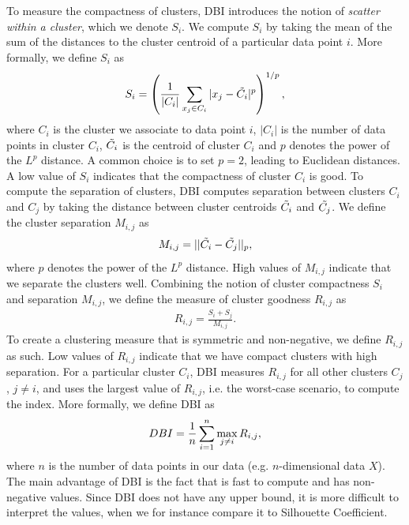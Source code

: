 To measure the compactness of clusters, DBI introduces the notion of \textit{scatter within a cluster}, which we denote $S_i$. We compute $S_i$ by taking the mean of the sum of the distances to the cluster centroid of a particular data point $i$. More formally, we define $S_i$ as
\begin{align}
    S_i = \left( \frac{1}{|C_i|} \sum\limits_{x_j \in C_i}^{} |x_j - \Tilde{C_i}|^p\right)^{1/p},
    \label{eqn:dbi-s}
\end{align}
where $C_i$ is the cluster we associate to data point $i$, $|C_i|$ is the number of data points in cluster $C_i$, $\Tilde{C_i}$ is the centroid of cluster $C_i$ and $p$ denotes the power of the $L^p$ distance. A common choice is to set $p=2$, leading to Euclidean distances. A low value of $S_i$ indicates that the compactness of cluster $C_i$ is good. To compute the separation of clusters, DBI computes separation between clusters $C_i$ and $C_j$ by taking the distance between cluster centroids $\Tilde{C_i}$ and $\Tilde{C_j}$. We define the cluster separation $M_{i, j}$ as
\begin{align}
    M_{i, j} = ||\Tilde{C_i} - \Tilde{C_j}||_p,
    \label{eqn:dbi-m}
\end{align}
where $p$ denotes the power of the $L^p$ distance. High values of $M_{i, j}$ indicate that we separate the clusters well. Combining the notion of cluster compactness $S_i$ and separation $M_{i, j}$, we define the measure of cluster goodness $R_{i, j}$ as
\begin{align}
    R_{i, j} = \frac{S_i + S_j}{M_{i, j}}.
    \label{eqn:dbi-r}
\end{align}
To create a clustering measure that is symmetric and non-negative, we define $R_{i, j}$ as such. Low values of $R_{i, j}$ indicate that we have compact clusters with high separation. For a particular cluster $C_i$, DBI measures $R_{i, j}$ for all other clusters $C_j$, $j \neq i$, and uses the largest value of $R_{i, j}$, i.e. the worst-case scenario, to compute the index. More formally, we define DBI as
\begin{align}
    DBI = \frac{1}{n} \sum\limits_{i=1}^{n} \max_{j \neq i} R_{i, j},
    \label{eqn:dbi}
\end{align}
where $n$ is the number of data points in our data (e.g. $n$-dimensional data $X$). The main advantage of DBI is the fact that is fast to compute and has non-negative values. Since DBI does not have any upper bound, it is more difficult to interpret the values, when we for instance compare it to Silhouette Coefficient.

